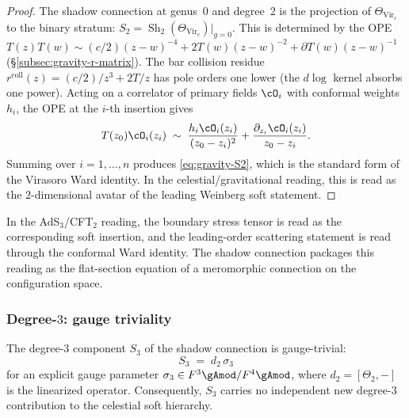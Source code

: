 \begin{proof}
The shadow connection at genus~$0$ and degree~$2$ is the
projection of $\Theta_{\mathrm{Vir}_c}$ to the binary stratum:
$S_2 = \operatorname{Sh}_2(\Theta_{\mathrm{Vir}_c})|_{g=0}$.
This is determined by the OPE
$T(z)T(w) \sim (c/2)(z{-}w)^{-4} + 2T(w)(z{-}w)^{-2}
+ \partial T(w)(z{-}w)^{-1}$
(\S\ref{subsec:gravity-r-matrix}). The bar collision residue
$r^{\mathrm{coll}}(z) = (c/2)/z^3 + 2T/z$ has pole orders
one lower (the $d\log$ kernel absorbs one power).
Acting on a correlator of primary fields $\cO_i$ with conformal
weights $h_i$, the OPE at the $i$-th insertion gives
\[
T(z_0)\cO_i(z_i)
\;\sim\;
\frac{h_i\cO_i(z_i)}{(z_0 - z_i)^2}
+ \frac{\partial_{z_i}\cO_i(z_i)}{z_0 - z_i}.
\]
Summing over $i = 1, \ldots, n$ produces
\eqref{eq:gravity-S2}, which is the standard form of the
Virasoro Ward identity. In the celestial/gravitational reading,
this is read as the $2$-dimensional avatar of the leading Weinberg soft
statement.
\end{proof}

In the AdS$_3$/CFT$_2$ reading, the boundary stress tensor is read
as the corresponding soft insertion, and the leading-order scattering statement is
read through the conformal Ward identity. The shadow connection
packages this reading as the flat-section equation of a meromorphic
connection on the configuration space.

\subsubsection*{Degree-$3$: gauge triviality}

\begin{theorem}
\label{thm:gravity-cubic-gauge-trivial}
The degree-$3$ component $S_3$ of the shadow connection is
gauge-trivial:
\[
S_3 \;=\; d_2\,\sigma_3
\]
for an explicit gauge parameter
$\sigma_3 \in F^3\gAmod / F^4\gAmod$, where $d_2 = [\Theta_2, -]$
is the linearized operator. Consequently, $S_3$ carries no
independent new degree-$3$ contribution to the celestial soft
hierarchy.
\end{theorem}

